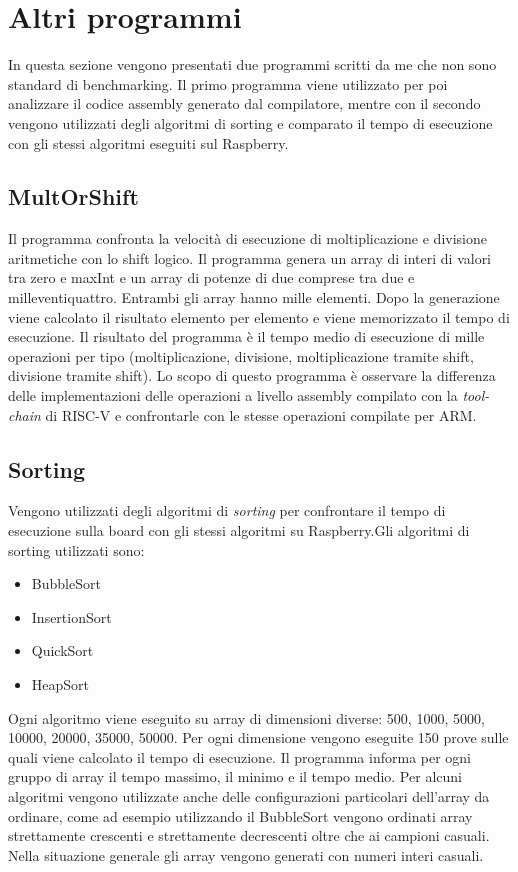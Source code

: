 \documentclass[12pt, a4paper]{report}
\begin{document}

\section{Altri programmi} 

In questa sezione vengono presentati due programmi scritti da me che non sono standard di benchmarking. Il primo programma viene utilizzato per poi analizzare il codice assembly generato dal compilatore, mentre con il secondo vengono utilizzati degli algoritmi di sorting e comparato il tempo di esecuzione con gli stessi algoritmi eseguiti sul Raspberry.


\subsection{MultOrShift}
	Il programma confronta la velocità di esecuzione di moltiplicazione e divisione
aritmetiche con lo shift logico. Il programma genera un array di interi di
valori tra zero e maxInt e un array di potenze di due comprese tra due e
milleventiquattro. Entrambi gli array hanno mille elementi. Dopo la generazione
viene calcolato il risultato elemento per elemento e viene memorizzato il
tempo di esecuzione. Il risultato del programma \`e il tempo medio di esecuzione
di mille operazioni per tipo (moltiplicazione, divisione, 
moltiplicazione tramite shift, divisione tramite shift). 
Lo scopo di questo programma è osservare la differenza delle implementazioni delle operazioni a livello assembly compilato con la \textit{tool-chain} di RISC-V e confrontarle con le stesse operazioni compilate per ARM.
		
		
\subsection{Sorting}
Vengono utilizzati degli algoritmi di \textit{sorting} per confrontare il tempo di esecuzione sulla board con gli stessi algoritmi su Raspberry.Gli algoritmi di sorting utilizzati sono:
\begin{itemize}
	\item BubbleSort
	\item InsertionSort
	\item QuickSort
	\item HeapSort
\end{itemize}

Ogni algoritmo viene eseguito su array di dimensioni diverse: 500, 1000, 5000, 10000, 20000, 35000, 50000. Per ogni dimensione vengono eseguite 150 prove sulle quali viene calcolato il tempo di esecuzione. Il programma informa per ogni gruppo di array il tempo massimo, il minimo e il tempo medio. Per alcuni algoritmi vengono utilizzate anche delle configurazioni particolari dell'array da ordinare, come ad esempio utilizzando il BubbleSort vengono ordinati array strettamente crescenti e strettamente decrescenti oltre che ai campioni casuali. Nella situazione generale gli array vengono generati con numeri interi casuali.
\end{document}
